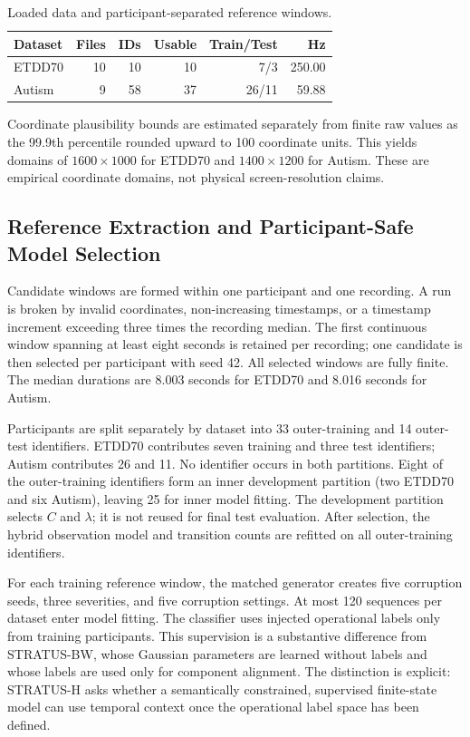 \documentclass[sigconf,review]{acmart}
\newcommand{\methodBW}{\textsc{STRATUS-BW}\xspace}
\newcommand{\methodH}{\textsc{STRATUS-H}\xspace}
\begin{document}
\begin{table}[h]
\centering
\caption{Loaded data and participant-separated reference windows.}
\label{tab:datasets}
\small
\begin{tabular}{lrrrrr}
\toprule
Dataset & Files & IDs & Usable & Train/Test & Hz \\
\midrule
ETDD70 & 10 & 10 & 10 & 7/3 & 250.00 \\
Autism & 9 & 58 & 37 & 26/11 & 59.88 \\
\bottomrule
\end{tabular}
\end{table}

Coordinate plausibility bounds are estimated separately from finite raw values as the 99.9th percentile rounded upward to 100 coordinate units. This yields domains of $1600\times1000$ for ETDD70 and $1400\times1200$ for Autism. These are empirical coordinate domains, not physical screen-resolution claims.

\subsection{Reference Extraction and Participant-Safe Model Selection}

Candidate windows are formed within one participant and one recording. A run is broken by invalid coordinates, non-increasing timestamps, or a timestamp increment exceeding three times the recording median. The first continuous window spanning at least eight seconds is retained per recording; one candidate is then selected per participant with seed 42. All selected windows are fully finite. The median durations are 8.003 seconds for ETDD70 and 8.016 seconds for Autism.

Participants are split separately by dataset into 33 outer-training and 14 outer-test identifiers. ETDD70 contributes seven training and three test identifiers; Autism contributes 26 and 11. No identifier occurs in both partitions. Eight of the outer-training identifiers form an inner development partition (two ETDD70 and six Autism), leaving 25 for inner model fitting. The development partition selects $C$ and $\lambda$; it is not reused for final test evaluation. After selection, the hybrid observation model and transition counts are refitted on all outer-training identifiers.

For each training reference window, the matched generator creates five corruption seeds, three severities, and five corruption settings. At most 120 sequences per dataset enter model fitting. The classifier uses injected operational labels only from training participants. This supervision is a substantive difference from \methodBW, whose Gaussian parameters are learned without labels and whose labels are used only for component alignment. The distinction is explicit: \methodH asks whether a semantically constrained, supervised finite-state model can use temporal context once the operational label space has been defined.
\end{document}
